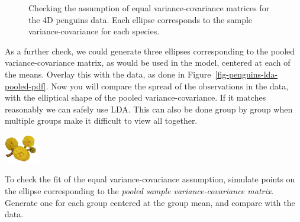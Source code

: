 \documentclass[
  letterpaper,
]{krantz}
\newcommand{\infobox}[1]{%
\noindent\colorbox{info!30}{%
\begin{minipage}{0.98\linewidth}%
    \centering%
    \begin{minipage}[c]{0.15\linewidth} %
      \includegraphics[width=1.5cm]{images/mulga-flowers2.png} %
    \end{minipage}%
    \hfill %
    \begin{minipage}[c]{0.8\linewidth} %
      \bigskip%
      \textsf{#1}%
      \bigskip%
    \end{minipage}%
    \hspace*{3mm}%
  \end{minipage}%
}%
}
\begin{document}
\begin{figure}
\begin{minipage}{0.50\linewidth}
{}


\end{minipage}%

\caption{\label{fig-penguins-lda-ellipses-pdf}Checking the assumption of
equal variance-covariance matrices for the 4D penguins data. Each
ellipse corresponds to the sample variance-covariance for each species.}

\end{figure}%

As a further check, we could generate three ellipses corresponding to
the pooled variance-covariance matrix, as would be used in the model,
centered at each of the means. Overlay this with the data, as done in
Figure~\ref{fig-penguins-lda-pooled-pdf}. Now you will compare the
spread of the observations in the data, with the elliptical shape of the
pooled variance-covariance. If it matches reasonably we can safely use
LDA. This can also be done group by group when multiple groups make it
difficult to view all together.

\infobox{To check the fit of the equal variance-covariance assumption, simulate points on the ellipse corresponding to the \emph{pooled sample variance-covariance matrix}. Generate one for each group centered at the group mean, and compare with the data.}

\end{document}
